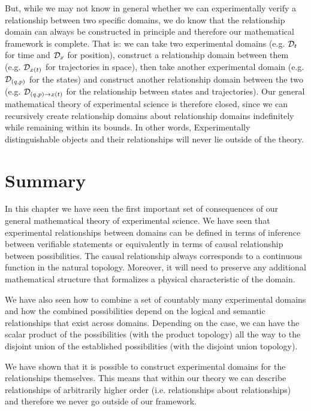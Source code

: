 \documentclass[11pt,letterpaper,fleqn]{memoir} %
\begin{document}
But, while we may not know in general whether we can experimentally verify a relationship between two specific domains, we do know that the relationship domain can always be constructed in principle and therefore our mathematical framework is complete. That is: we can take two experimental domains (e.g. $\mathcal{D}_t$ for time and $\mathcal{D}_x$ for position), construct a relationship domain between them (e.g. $\mathcal{D}_{x(t)}$ for trajectories in space), then take another experimental domain (e.g. $\mathcal{D}_{(q,p)}$ for the states) and construct another relationship domain between the two (e.g. $\mathcal{D}_{(q,p)\to x(t)}$ for the relationship between states and trajectories). Our general mathematical theory of experimental science is therefore closed, since we can recursively create relationship domains about relationship domains indefinitely while remaining within its bounds. In other words, Experimentally distinguishable objects and their relationships will never lie outside of the theory.


\section{Summary}

In this chapter we have seen the first important set of consequences of our general mathematical theory of experimental science. We have seen that experimental relationships between domains can be defined in terms of inference between verifiable statements or equivalently in terms of causal relationship between possibilities. The causal relationship always corresponds to a continuous function in the natural topology. Moreover, it will need to preserve any additional mathematical structure that formalizes a physical characteristic of the domain.

We have also seen how to combine a set of countably many experimental domains and how the combined possibilities depend on the logical and semantic relationships that exist across domains. Depending on the case, we can have the scalar product of the possibilities (with the product topology) all the way to the disjoint union of the established possibilities (with the disjoint union topology).

We have shown that it is possible to construct experimental domains for the relationships themselves. This means that within our theory we can describe relationships of arbitrarily higher order (i.e. relationships about relationships) and therefore we never go outside of our framework.
\end{document}
